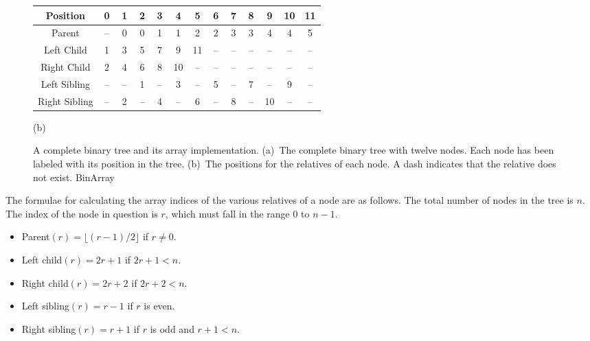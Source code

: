 \begin{figure}
\vspace{-\bigskipamount}
\vspace{-\smallskipamount}

\begin{center}
\sffamily
\begin{tabular}{|c|c|c|c|c|c|c|c|c|c|c|c|c|}
\hline
Position      & 0  & 1 & 2 & 3 &  4 &  5 & 6 & 7 & 8 &  9 & 10 & 11\\
\hline
\hline
Parent        & \,--\, & 0 & 0 & 1 &  1 &  2 &  2 & 3 & 3 & 4 & 4 &  5\\
\hline
Left Child    & 1  & 3 & 5 & 7 &  9 & 11 & \,--\, & \,--\, & \,--\, & \,--\, & \,--\, &  \,--\,\\
\hline
Right Child   & 2  & 4 & 6 & 8 & 10 & \,--\, & \,--\, & \,--\, & \,--\, & \,--\, & \,--\, &  \,--\,\\
\hline
Left Sibling  & \,--\, & \,--\, & 1 & \,--\, &  3 & \,--\, & 5 & \,--\, & 7 & \,--\, &  9 &  \,--\,\\
\hline
Right Sibling & \,--\, & 2 & \,--\, & 4 & \,--\, &  6 & \,--\, & 8 & \,--\, & 10 & \,--\, & \,--\,\\
\hline
\end{tabular}
\end{center}

\vspace{-\bigskipamount}
\vspace{-\medskipamount}
\begin{center}
{\textsf{\footnotesize (b)}}
\end{center}

{A complete binary tree and its array implementation.
(a)~The complete binary tree with twelve nodes.
Each node has been labeled with its position in the tree.
(b)~The positions for the relatives of each node.
A dash indicates that the relative does not exist.}
{BinArray}
\bigskip
\end{figure}

The formulae for calculating the array indices of the various
relatives of a node are as follows.
The total number of nodes in the tree is \(n\).
The index of the node in question is \(r\),
which must fall in the range 0 to \(n-1\).

\begin{itemize}
\item
Parent\((r) = \lfloor(r - 1)/2\rfloor\) if \(r \neq 0\).
\item
Left child\((r) = 2r + 1\) if \(2r + 1 < n\).
\item
Right child\((r) = 2r + 2\) if \(2r + 2 < n\).
\item
Left sibling\((r) = r - 1\) if \(r\) is even.
\item
Right sibling\((r) = r + 1\) if \(r\) is odd and \(r + 1 < n\).
\end{itemize}

